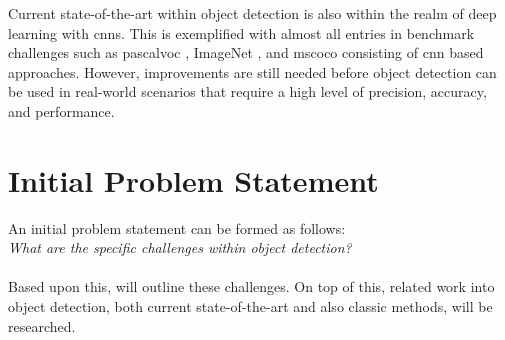 Current state-of-the-art within object detection is also within the realm of deep learning with \glspl{cnn}. This is exemplified with almost all entries in benchmark challenges such as \gls{pascalvoc} \cite{pascalvoc2012}, ImageNet \cite{imagenet}, and \gls{mscoco} \cite{mscoco} consisting of \gls{cnn} based approaches. However, improvements are still needed before object detection can be used in real-world scenarios that require a high level of precision, accuracy, and performance. 

\section{Initial Problem Statement}

\begin{comment}
	- what are specific problems within object detection?
	- 
\end{comment}

An initial problem statement can be formed as follows: \\

\textit{What are the specific challenges within object detection?} \\ \\
Based upon this,  will outline these challenges. On top of this, related work into object detection, both current state-of-the-art and also classic methods, will be researched.
